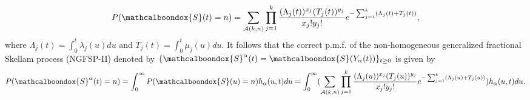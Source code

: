 \documentclass[11pt,oneside,reqno]{amsart}
\theoremstyle{definition}
\newtheorem{remark}{\bf Remark}[section]
\theoremstyle{remarkstyle}
\begin{document}
    \begin{equation*}
        P(\mathcalboondox{S}(t)=n)=\sum_{\mathcal{A}(k,n)}\prod_{j=1}^{k}\frac{(\Lambda_j(t))^{x_j}(T_j(t))^{y_j}}{x_j!y_j!}e^{-\sum_{j=1}^{k}(\Lambda_j(t)+T_j(t))},
    \end{equation*}
    where $\Lambda_j(t)=\int_{0}^{t}\lambda_j(u)du$ and $T_j(t)=\int_{0}^{t}\mu_j(u)du$. It follows that the correct p.m.f. of the non-homogeneous generalized fractional Skellam process (NGFSP-II) denoted by $\{\mathcalboondox{S}^\alpha(t)=\mathcalboondox{S}(Y_\alpha(t))\}_{t\ge 0}$ is given by 
    \begin{equation*}
        P(\mathcalboondox{S}^\alpha(t)=n)=\int_{0}^{\infty}P(\mathcalboondox{S}(u)=n)h_\alpha(u,t)du=\int_{0}^{\infty}(\sum_{\mathcal{A}(k,n)}\prod_{j=1}^{k}\frac{(\Lambda_j(u))^{x_j}(T_j(u))^{y_j}}{x_j!y_j!}e^{-\sum_{j=1}^{k}(\Lambda_j(u)+T_j(u))})h_\alpha(u,t)du.
    \end{equation*}

\end{document}
